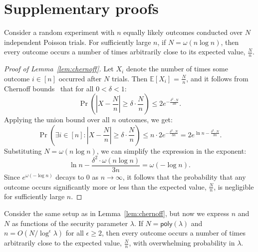\clearpage
%
%

 

\appendix 

\clearpage

\section{Supplementary proofs} \label{sec:proofs}

\begin{lemma} \label{lem:chernoff} Consider a random experiment with $n$ equally likely outcomes conducted over $N$ independent Poisson trials. For sufficiently large $n$, if $N = \omega(n \log n)$, then every outcome occurs a number of times arbitrarily close to its expected value, $\frac{N}{n}$. 
\end{lemma} 

\begin{proof}[Proof of Lemma~\ref{lem:chernoff}]
Let $X_i$ denote the number of times some outcome $i \in [n]$ occurred after $N$ trials. Then $\mathbb{E}[X_i]$ = $\frac{N}{n}$, and it follows from Chernoff bounds~\cite[Cor.~4.6]{MU05} that for all $0 < \delta < 1$:
$$
\Pr\left(|X - \frac{N}{n}| \geq \delta \cdot \frac{N}{n} \right) \leq 2 e^{-\frac{\delta^2 \cdot N}{3n}}.
$$
Applying the union bound over all $n$ outcomes, we get:
$$
\Pr\left(\exists i \in [n]: |X - \frac{N}{n}| \geq \delta \cdot \frac{N}{n} \right) \leq n \cdot 2 e^{-\frac{\delta^2 \cdot N}{3n}} = 2 e^{\ln n -\frac{\delta^2 \cdot N}{3n}}.
$$
Substituting $N = \omega(n \log n)$, we can simplify the expression in the exponent:
$$
\ln n - \frac{\delta^2 \cdot \omega(n \log n)}{3n} = \omega(-\log n).
$$
Since $e^{\omega(-\log n)}$ decays to 0 as $n \rightarrow \infty$, it follows that the probability that any outcome occurs significantly more or less than the expected value, $\frac{N}{n}$, is negligible for sufficiently large $n$.
\end{proof}


\begin{lemma} \label{lem:chernoff-1} Consider the same setup as in Lemma~\ref{lem:chernoff}, but now we express $n$ and $N$ as functions of the security parameter $\lambda$. If $N = \mathsf{poly}(\lambda)$ and $n = O(N / \log^\epsilon \lambda)$ for all $\epsilon \geq 2$, then every outcome occurs a number of times arbitrarily close to the expected value, $\frac{N}{n}$, with overwhelming probability in $\lambda$.
\end{lemma} 


